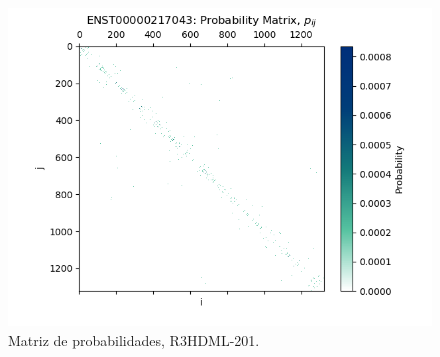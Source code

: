 \documentclass[a4paper,11pt,titlepage]{article}
\theoremstyle{definition}
\begin{document}
\begin{figure}[H]
    \hfill
    \begin{minipage}[c]{0.31\textwidth}
        \centering
        \includegraphics[width=\textwidth]{images/R3HDML-201-db_iter-matrix.png}
        \caption{Matriz de probabilidades, R3HDML-201.}
        \label{fig:R3HDML-201-matrix}
    \end{minipage}
\end{figure}
\end{document}
